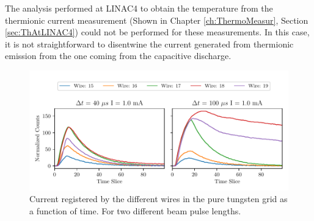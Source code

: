 The analysis performed at LINAC4 to obtain the temperature from the thermionic current measurement (Shown in Chapter \ref{ch:ThermoMeasur}, Section \ref{sec:ThAtLINAC4}) could not be performed for these measurements. In this case, it is not straightforward to disentwine the current generated from thermionic emission from the one coming from the capacitive discharge.  

\begin{figure}[htb]
    \centering
    \includegraphics[width=1.0\columnwidth]{TimeEvolutionProjStudy2/TimeEvolutionStudy2.pdf}
    \caption{Current registered by the different wires in the pure tungsten grid as a function of time. For two different beam pulse lengths. }
    \label{fig:ProjectionOfStudy2}
\end{figure}
